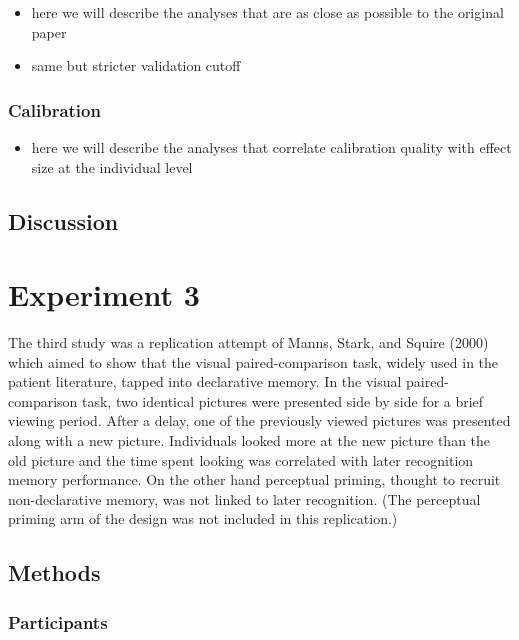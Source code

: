\documentclass[
  english,
  man,floatsintext]{apa6}
\providecommand{\tightlist}{%
  \setlength{\itemsep}{0pt}\setlength{\parskip}{0pt}}
\begin{document}
\begin{itemize}
\item
  here we will describe the analyses that are as close as possible to the original paper
\item
  same but stricter validation cutoff
\end{itemize}

\hypertarget{calibration-1}{%
\subsubsection{Calibration}\label{calibration-1}}

\begin{itemize}
\tightlist
\item
  here we will describe the analyses that correlate calibration quality with effect size at the individual level
\end{itemize}

\hypertarget{discussion-1}{%
\subsection{Discussion}\label{discussion-1}}

\hypertarget{experiment-3}{%
\section{Experiment 3}\label{experiment-3}}

The third study was a replication attempt of Manns, Stark, and Squire (2000) which aimed to show that the visual paired-comparison task, widely used in the patient literature, tapped into declarative memory. In the visual paired-comparison task, two identical pictures were presented side by side for a brief viewing period. After a delay, one of the previously viewed pictures was presented along with a new picture. Individuals looked more at the new picture than the old picture and the time spent looking was correlated with later recognition memory performance. On the other hand perceptual priming, thought to recruit non-declarative memory, was not linked to later recognition. (The perceptual priming arm of the design was not included in this replication.)

\hypertarget{methods-2}{%
\subsection{Methods}\label{methods-2}}

\hypertarget{participants-3}{%
\subsubsection{Participants}\label{participants-3}}
\end{document}
